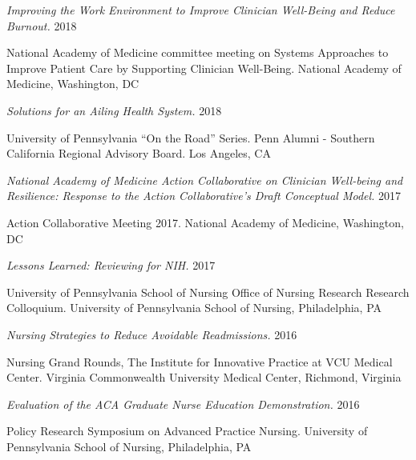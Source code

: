 \documentclass[10pt,]{article}
\begin{document}
{{{{{{{{{{{{{{{\begin{hangparas}{.5in}{1}
{\textit {Improving the Work Environment to Improve Clinician Well-Being and Reduce Burnout.}} \hfill 2018 
\vspace{-2.5mm}
\begin{adjustwidth}{0.5cm}{1cm}
National Academy of Medicine committee meeting on Systems Approaches to Improve Patient Care by Supporting Clinician Well-Being. National Academy of Medicine, Washington, DC
\end{adjustwidth}

{\textit {Solutions for an Ailing Health System.}} \hfill 2018 
\vspace{-2.5mm}
\begin{adjustwidth}{0.5cm}{1cm}
University of Pennsylvania “On the Road” Series. Penn Alumni - Southern California Regional Advisory Board. Los Angeles, CA
\end{adjustwidth}

{\textit {National Academy of Medicine Action Collaborative on Clinician Well-being and Resilience: Response to the Action Collaborative’s Draft Conceptual Model.}} \hfill 2017 
\vspace{-2.5mm}
\begin{adjustwidth}{0.5cm}{1cm}
Action Collaborative Meeting 2017. National Academy of Medicine, Washington, DC
\end{adjustwidth}

{\textit {Lessons Learned: Reviewing for NIH.}} \hfill 2017 
\vspace{-2.5mm}
\begin{adjustwidth}{0.5cm}{1cm}
University of Pennsylvania School of Nursing Office of Nursing Research Research Colloquium. University of Pennsylvania School of Nursing, Philadelphia, PA
\end{adjustwidth}

{\textit {Nursing Strategies to Reduce Avoidable Readmissions.}} \hfill 2016 
\vspace{-2.5mm}
\begin{adjustwidth}{0.5cm}{1cm}
Nursing Grand Rounds, The Institute for Innovative Practice at VCU Medical Center. Virginia Commonwealth University Medical Center, Richmond, Virginia
\end{adjustwidth}

{\textit {Evaluation of the ACA Graduate Nurse Education Demonstration.}} \hfill 2016 
\vspace{-2.5mm}
\begin{adjustwidth}{0.5cm}{1cm}
Policy Research Symposium on Advanced Practice Nursing. University of Pennsylvania School of Nursing, Philadelphia, PA
\end{adjustwidth}


\end{hangparas}}}}}}}}}}}}}}}}
\end{document}
